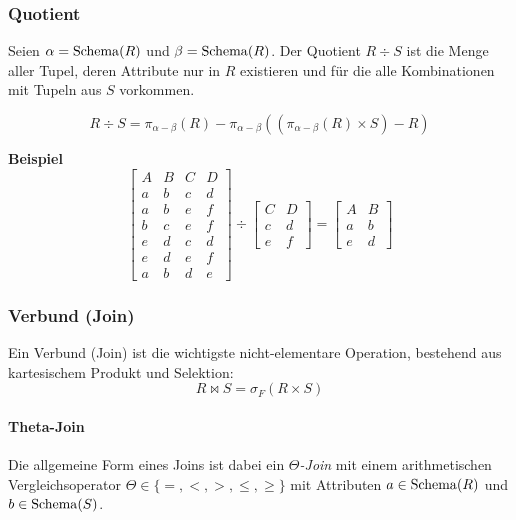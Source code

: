 			\subsubsection{Quotient} %
				Seien \( \alpha = \operatorname{Schema}(R) \) und \( \beta = \operatorname{Schema}(R) \). Der Quotient \( R \div S \) ist die Menge aller Tupel, deren Attribute nur in \(R\) existieren und für die alle Kombinationen mit Tupeln aus \(S\) vorkommen.

				\begin{equation*}
					R \div S = \pi_{\alpha - \beta}(R) - \pi_{\alpha - \beta}((\pi_{\alpha-\beta}(R) \times S) - R)
				\end{equation*}

				\textbf{Beispiel}
				\begin{equation*}
					\begin{bmatrix}
						A & B & C & D \\ \hline
						a & b & c & d \\
						a & b & e & f \\
						b & c & e & f \\
						e & d & c & d \\
						e & d & e & f \\
						a & b & d & e
					\end{bmatrix}
					\div
					\begin{bmatrix}
						C & D \\ \hline
						c & d \\
						e & f
					\end{bmatrix}
					=
					\begin{bmatrix}
						A & B \\ \hline
						a & b \\
						e & d
					\end{bmatrix}
				\end{equation*}

			\subsubsection{Verbund (Join)} %
				Ein Verbund (Join) ist die wichtigste nicht-elementare Operation, bestehend aus kartesischem Produkt und Selektion:
				\begin{equation*}
					R \bowtie S = \sigma_F(R \times S)
				\end{equation*}

				\paragraph{Theta-Join} %
					Die allgemeine Form eines Joins ist dabei ein \textit{\(\Theta\)-Join} mit einem arithmetischen Vergleichsoperator \( \Theta \in \{ =, <, >, \leq, \geq \} \) mit Attributen \( a \in \operatorname{Schema}(R) \) und \( b \in \operatorname{Schema}(S) \).

